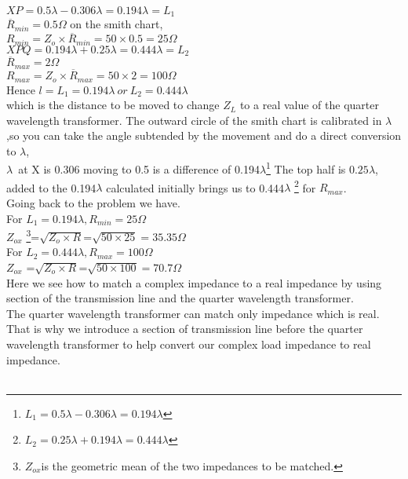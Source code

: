 $XP=0.5\lambda-0.306\lambda=0.194 \lambda=L_1$ \\
$\overline{R}_{min} =0.5\Omega$ on the smith chart,\\
$R_{min}=Z_{o} \times \overline{R}_{min}=50\times0.5=25\Omega$ \\
$XPQ=0.194\lambda+0.25\lambda=0.444\lambda=L_2$\\
$\overline{R}_{max}=2\Omega$\\
$R_{max}=Z_{o} \times \overline{R}_{max}=50\times2=100\Omega$\\
Hence $l=L_1=0.194\lambda \ or \ L_2=0.444\lambda$\\
which is the distance to be moved to change $Z_{L}$ to a real value of the quarter wavelength transformer. 
 The outward circle of the smith chart is calibrated in $\lambda$,so you can take the angle subtended by the movement and do a direct conversion to $\lambda$,\\
 $\lambda$\ at X is 0.306 moving to 0.5 is a difference of 0.194$\lambda$\footnote{$L_1=0.5\lambda - 0.306\lambda=0.194\lambda$}
  The top half is $0.25\lambda$, added to the 0.194$\lambda$ calculated initially brings us to 0.444$\lambda$ \footnote{$L_2=0.25\lambda+0.194\lambda=0.444\lambda$}
   for $R_{max}$. \\
   Going back to the problem we have.\\
 For $L_1=0.194\lambda, R_{min}=25\varOmega$\\ 
  $Z_{ox}$ \footnote{$Z_{ox}$is the geometric mean of the two impedances to be matched.}=$\sqrt{Z_o\times R}$=$\sqrt{50\times25}=35.35\varOmega$ \\
   For $L_2=0.444\lambda, R_{max}=100\varOmega$\\   
    $Z_{ox}$ =$\sqrt{Z_o\times R}$=$\sqrt{50\times100}=70.7\varOmega$  \\
    Here we see how to match a complex impedance to a real impedance by using section of the transmission line and the quarter wavelength transformer.\\
    The quarter wavelength transformer can match only impedance which is real. That is why we introduce a section of transmission line before the quarter wavelength transformer to help convert our complex load impedance to real impedance.\\\\
    
